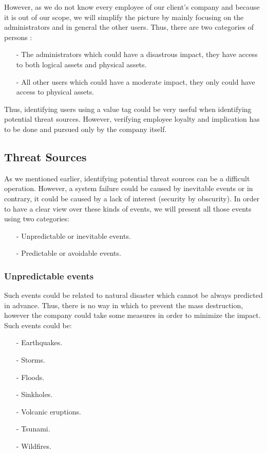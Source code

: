 \documentclass[a4paper,10pt]{article}
\begin{document}
However, as we do not know every employee of our client's company and because it is out of our scope, we will simplify the picture by mainly focusing on the administrators and in general the other users. Thus, there are two categories of persons :
\begin{enumerate}
\item[-] The administrators which could have a disastrous impact, they have access to both logical assets and physical assets.
\item[-] All other users which could have a moderate impact, they only could have access to physical assets.
\end{enumerate}
Thus, identifying users using a value tag could be very useful when identifying potential threat sources. However, verifying employee loyalty and implication has to be done and pursued only by the company itself.

\subsection{Threat Sources}

As we mentioned earlier, identifying potential threat sources can be a difficult operation. However, a system failure could be caused by inevitable events or in contrary, it could be caused by a lack of interest (security by obscurity). In order to have a clear view over these kinds of events, we will present all those events using two categories:
\begin{enumerate}
\item[-] Unpredictable or inevitable events.
\item[-] Predictable or avoidable events.
\end{enumerate}

\subsubsection{Unpredictable events}
Such events could be related to natural disaster which cannot be always predicted in advance. Thus, there is no way in which to prevent the mass destruction, however the company could take some measures in order to minimize the impact. Such events could be:
\begin{enumerate}
\item[-] Earthquakes.
\item[-] Storms.
\item[-] Floods.
\item[-] Sinkholes.
\item[-] Volcanic eruptions.
\item[-] Tsunami.
\item[-] Wildfires.
\end{enumerate}
\end{document}
